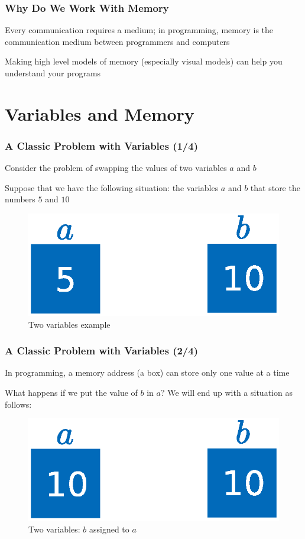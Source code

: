 \documentclass{beamer}
\begin{document}
\begin{frame}
\frametitle{Why Do We Work With Memory}
    Every communication requires a medium; in programming, memory is the communication medium between programmers and computers
    \newline

    Making high level models of memory (especially visual models) can help you understand your programs
\end{frame}

\section{Variables and Memory}

\begin{frame}
\frametitle{A Classic Problem with Variables (1/4)}
    Consider the problem of swapping the values of two variables $a$ and $b$
    \newline

    Suppose that we have the following situation: the variables $a$ and $b$ that store the numbers $5$ and $10$

    \begin{figure}[H]
        \centering
        \includegraphics[scale=0.5]{figures/two_variables_example/example.eps}
        \caption{Two variables example}
    \end{figure}
\end{frame}

\begin{frame}
\frametitle{A Classic Problem with Variables (2/4)}
    In programming, a memory address (a box) can store only one value at a time
    \newline

    What happens if we put the value of $b$ in $a$? We will end up with a situation as follows:
    \begin{figure}[H]
        \centering
        \includegraphics[scale=0.5]{figures/two_variables_example/assignment.eps}
        \caption{Two variables: $b$ assigned to $a$}
    \end{figure}
\end{frame}
\end{document}
